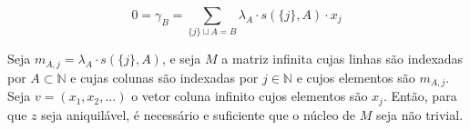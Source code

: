 \documentclass{article}
\newcommand{\N}{\mathbb{N}}
\begin{document}
\[
    0 = \gamma_B = \sum_{\{j\} \sqcup A = B} \lambda_A \cdot s(\{j\}, A) \cdot x_j
\]

Seja $m_{A, j} = \lambda_A \cdot s(\{j\}, A)$, e seja $M$ a matriz infinita cujas linhas são indexadas por $A \subset \N$ e cujas colunas são indexadas por $j \in \N$ e cujos elementos são $m_{A, j}$. Seja $v = (x_1, x_2, \dots)$ o vetor coluna infinito cujos elementos são $x_j$. Então, para que $z$ seja aniquilável, é necessário e suficiente que o núcleo de $M$ seja não trivial.
\end{document}
